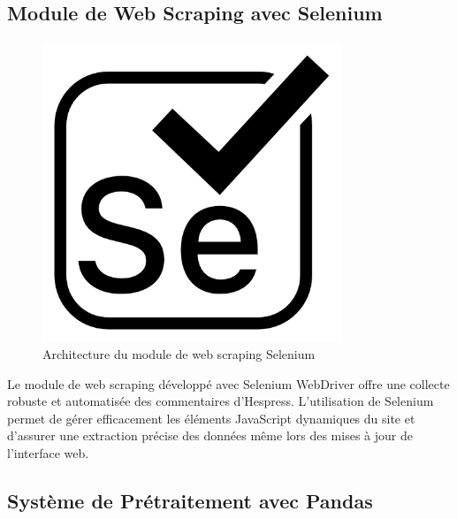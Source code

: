 \subsection{Module de Web Scraping avec Selenium}

\begin{figure}[H]
\centering
\includegraphics[width=0.8\textwidth]{assets/images/selenium.png}
\caption{Architecture du module de web scraping Selenium}
\label{fig:selenium-scraping}
\end{figure}

Le module de web scraping développé avec Selenium WebDriver offre une collecte robuste et automatisée des commentaires d'Hespress. L'utilisation de Selenium permet de gérer efficacement les éléments JavaScript dynamiques du site et d'assurer une extraction précise des données même lors des mises à jour de l'interface web.

\subsection{Système de Prétraitement avec Pandas}


